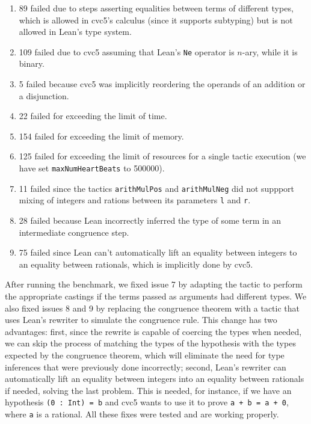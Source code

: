 \begin{enumerate}
  \item 89 failed due to steps asserting equalities between terms of different types, which is allowed in cvc5's calculus (since it supports subtyping) but is not allowed in Lean's type system.
  \item 109 failed due to cvc5 assuming that Lean's \texttt{Ne} operator is $n$-ary, while it is binary.
  \item 5 failed because cvc5 was implicitly reordering the operands of an addition or a disjunction.
  \item 22 failed for exceeding the limit of time.
  \item 154 failed for exceeding the limit of memory.
  \item 125 failed for exceeding the limit of resources for a single tactic execution (we have set \texttt{maxNumHeartBeats} to 500000).
  \item 11 failed since the tactics \texttt{arithMulPos} and \texttt{arithMulNeg} did not suppport mixing of integers and rations between its parameters \texttt{l} and \texttt{r}.
  \item 28 failed because Lean incorrectly inferred the type of some term in an intermediate congruence step.
  \item 75 failed since Lean can't automatically lift an equality between integers to an equality between rationals, which is implicitly done by cvc5.
\end{enumerate}

After running the benchmark, we fixed issue 7 by adapting the tactic to perform the
appropriate castings if the terms passed as arguments had different types. We also
fixed issues 8 and 9 by replacing the congruence theorem with a tactic that uses
Lean's rewriter to simulate the congruence rule.
This change has two advantages: first, since the rewrite is
capable of coercing the types when needed, we can skip the process
of matching the types of the hypothesis with the types expected by the congruence theorem, which will
eliminate the need for type inferences that were previously done incorrectly; second, Lean's rewriter
can automatically lift an equality between integers into an equality between rationals if needed, solving
the last problem. This is needed, for instance, if we have an hypothesis \texttt{(0 : Int) = b}
and cvc5 wants to use it to prove \texttt{a + b = a + 0}, where \texttt{a}
is a rational. All these fixes were tested and are working properly.

